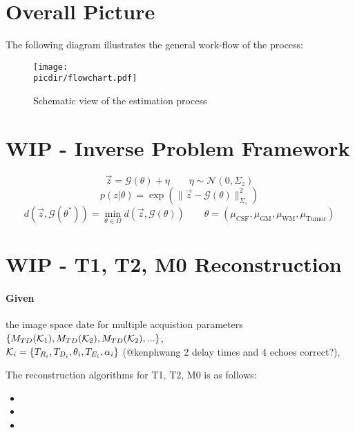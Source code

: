 \documentclass{article}         %
\theoremstyle{definition}
\theoremstyle{remark}
\newcommand{\picdir}{pdffig/}
\begin{document}
\section{Overall Picture}
The following diagram illustrates the general work-flow of the process:
\begin{figure}[h!!]
\center
\texttt{[image: \\picdir/flowchart.pdf]}
\caption{Schematic view of the estimation process}
\end{figure}

\section{WIP - Inverse Problem Framework}\label{InverseProbFramework}
\[
  \vec{z}  = \mathcal{G}(\theta) + \eta   \qquad   \eta \sim \mathcal{N}(0,\Sigma_z)
\]
\[
  p(z|\theta ) = \exp \left( \|\vec{z} -  \mathcal{G}(\theta)\|^2_{\Sigma_z} \right)
\]
\[
               d\left(\vec{z}, \mathcal{G}(\theta^*)\right) = 
   \min_{\theta \in \Omega} d\left(\vec{z}, \mathcal{G}(\theta)\right)
\qquad
\theta = \left(\mu_\text{CSF}, \mu_\text{GM}, \mu_\text{WM}, \mu_\text{Tumor} \right)
\]

\section{WIP - T1, T2, M0 Reconstruction}
\paragraph{Given}
the image space date for  multiple  acquistion parameters 
$\{ M_{TD}(\mathcal{K}_1),M_{TD}(\mathcal{K}_2), M_{TD}(\mathcal{K}_2),... \}$,  \\
 $\mathcal{K}_i=\{T_{R_i},T_{D_i},\theta_i,T_{E_i},\alpha_i\}$ 
{\color{red}(@kenphwang 2 delay times and 4 echoes correct?)},

The reconstruction algorithms for T1, T2, M0 is as follows:
\begin{itemize}
\item 
\item 
\item 
\end{itemize}
\end{document}
